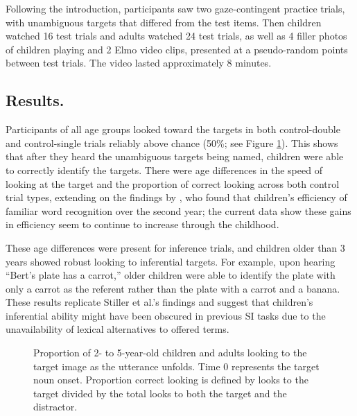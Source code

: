 \documentclass[10pt,letterpaper]{article}
\begin{document}
Following the introduction, participants saw two gaze-contingent practice trials, with unambiguous targets that differed from the test items. Then children watched 16 test trials and adults watched 24 test trials, as well as 4 filler photos of children playing and 2 Elmo video clips, presented at a pseudo-random points between test trials. The video lasted approximately 8 minutes.

\subsection{Results.}

Participants of all age groups looked toward the targets in both control-double and control-single trials reliably above chance (50\%; see Figure \ref{fig:age}). This shows that after they heard the unambiguous targets being named, children were able to correctly identify the targets. There were age differences in the speed of looking at the target and the proportion of correct looking across both control trial types, extending on the findings by , who found that children's efficiency of familiar word recognition over the second year; the current data show these gains in efficiency seem to continue to increase through the childhood. 

These age differences were present for inference trials, and children older than 3 years showed robust looking to inferential targets. For example, upon hearing ``Bert's plate has a carrot,'' older children were able to identify the plate with only a carrot as the referent rather than the plate with a carrot and a banana. These results replicate Stiller et al.'s findings and suggest that children's inferential ability might have been obscured in previous SI tasks due to the unavailability of lexical alternatives to offered terms.

\begin{figure}[t]
	\caption{\label{fig:age} Proportion of 2- to 5-year-old children and adults looking to the target image as the utterance unfolds. Time 0 represents the target noun onset. Proportion correct looking is defined by looks to the target divided by the total looks to both the target and the distractor.}
\end{figure}
\end{document}
